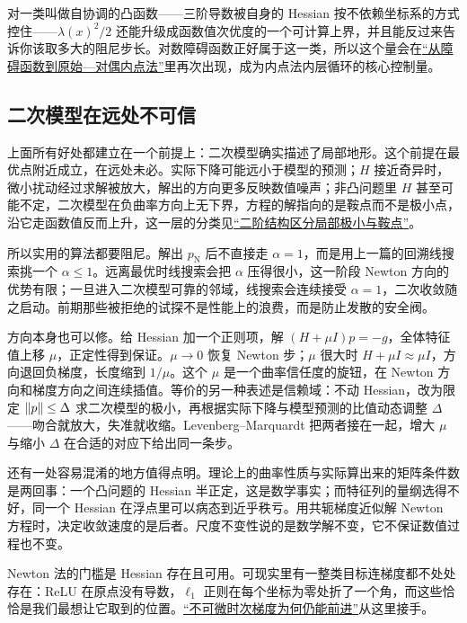 对一类叫做自协调的凸函数——三阶导数被自身的 Hessian 按不依赖坐标系的方式控住——\(\lambda(x)^2/2\) 还能升级成函数值次优度的一个可计算上界，并且能反过来告诉你该取多大的阻尼步长。对数障碍函数正好属于这一类，所以这个量会在\hyperref[sec:09-Convex-Optimization/06-Optimization-Algorithms/05]{``从障碍函数到原始---对偶内点法''}里再次出现，成为内点法内层循环的核心控制量。

\subsection{二次模型在远处不可信}

上面所有好处都建立在一个前提上：二次模型确实描述了局部地形。这个前提在最优点附近成立，在远处未必。实际下降可能远小于模型的预测；\(H\) 接近奇异时，微小扰动经过求解被放大，解出的方向更多反映数值噪声；非凸问题里 \(H\) 甚至可能不定，二次模型在负曲率方向上无下界，方程的解指向的是鞍点而不是极小点，沿它走函数值反而上升，这一层的分类见\hyperref[sec:09-Convex-Optimization/08-Nonconvex-and-Stochastic-Optimization/02]{``二阶结构区分局部极小与鞍点''}。

所以实用的算法都要阻尼。解出 \(p_{\mathrm N}\) 后不直接走 \(\alpha=1\)，而是用上一篇的回溯线搜索挑一个 \(\alpha\le1\)。远离最优时线搜索会把 \(\alpha\) 压得很小，这一阶段 Newton 方向的优势有限；一旦进入二次模型可靠的邻域，线搜索会连续接受 \(\alpha=1\)，二次收敛随之启动。前期那些被拒绝的试探不是性能上的浪费，而是防止发散的安全阀。

方向本身也可以修。给 Hessian 加一个正则项，解 \((H+\mu I)p=-g\)，全体特征值上移 \(\mu\)，正定性得到保证。\(\mu\to0\) 恢复 Newton 步；\(\mu\) 很大时 \(H+\mu I\approx\mu I\)，方向退回负梯度，长度缩到 \(1/\mu\)。这个 \(\mu\) 是一个曲率信任度的旋钮，在 Newton 方向和梯度方向之间连续插值。等价的另一种表述是信赖域：不动 Hessian，改为限定 \(\left\lVert p\right\rVert\le\Delta\) 求二次模型的极小，再根据实际下降与模型预测的比值动态调整 \(\Delta\)——吻合就放大，失准就收缩。Levenberg--Marquardt 把两者接在一起，增大 \(\mu\) 与缩小 \(\Delta\) 在合适的对应下给出同一条步。

还有一处容易混淆的地方值得点明。理论上的曲率性质与实际算出来的矩阵条件数是两回事：一个凸问题的 Hessian 半正定，这是数学事实；而特征列的量纲选得不好，同一个 Hessian 在浮点里可以病态到近乎秩亏。用共轭梯度近似解 Newton 方程时，决定收敛速度的是后者。尺度不变性说的是数学解不变，它不保证数值过程也不变。

Newton 法的门槛是 Hessian 存在且可用。可现实里有一整类目标连梯度都不处处存在：ReLU 在原点没有导数，\(\ell_1\) 正则在每个坐标为零处折了一个角，而这些恰恰是我们最想让它取到的位置。\hyperref[sec:09-Convex-Optimization/06-Optimization-Algorithms/03]{``不可微时次梯度为何仍能前进''}从这里接手。
